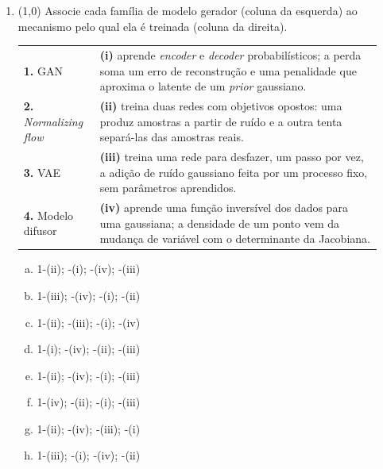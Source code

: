 \documentclass[11pt,a4paper]{article}
\renewcommand{\arraystretch}{1.4}
\begin{document}
\begin{enumerate}[1)]

\item (1{,}0) Associe cada família de modelo gerador (coluna da esquerda) ao mecanismo pelo qual ela é treinada (coluna da direita).

\begin{center}
\renewcommand{\arraystretch}{1.15}
\begin{tabular}{p{0.20\linewidth} p{0.74\linewidth}}
\textbf{1.} GAN & \textbf{(i)} aprende \textit{encoder} e \textit{decoder} probabilísticos; a perda soma um erro de reconstrução e uma penalidade que aproxima o latente de um \textit{prior} gaussiano. \\
\textbf{2.} \textit{Normalizing flow} & \textbf{(ii)} treina duas redes com objetivos opostos: uma produz amostras a partir de ruído e a outra tenta separá-las das amostras reais. \\
\textbf{3.} VAE & \textbf{(iii)} treina uma rede para desfazer, um passo por vez, a adição de ruído gaussiano feita por um processo fixo, sem parâmetros aprendidos. \\
\textbf{4.} Modelo difusor & \textbf{(iv)} aprende uma função inversível dos dados para uma gaussiana; a densidade de um ponto vem da mudança de variável com o determinante da Jacobiana. \\
\end{tabular}
\end{center}

\begin{enumerate}[a)]
    \item 1-(ii); -(i); -(iv); -(iii)
    \item 1-(iii); -(iv); -(i); -(ii)
    \item 1-(ii); -(iii); -(i); -(iv)
    \item 1-(i); -(iv); -(ii); -(iii)
    \item 1-(ii); -(iv); -(i); -(iii)
    \item 1-(iv); -(ii); -(i); -(iii)
    \item 1-(ii); -(iv); -(iii); -(i)
    \item 1-(iii); -(i); -(iv); -(ii)
\end{enumerate}


\end{enumerate}
\end{document}
